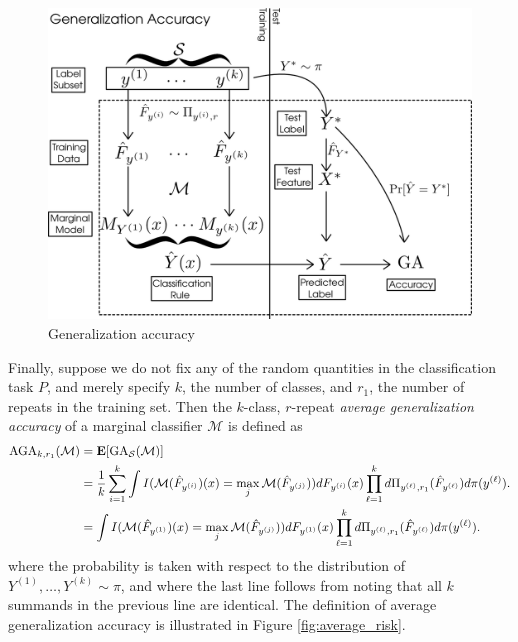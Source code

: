\begin{figure}[h]
\centering
\includegraphics[scale = 0.3]{../extrapolation_simple/risk.png}
\caption{Generalization accuracy}\label{fig:risk}
\end{figure}

Finally, suppose we do not fix any of the random quantities in the
classification task $P$, and merely specify $k$, the number of
classes, and $r_1$, the number of repeats in the training set.  
Then the $k$-class, $r$-repeat \emph{average generalization accuracy} of
a marginal classifier $\mathcal{M}$ is defined as
\begin{align*}
\text{AGA}_{k,r_1}(\mathcal{M}) &= \textbf{E}[\text{GA}_{\mathcal{S}}(\mathcal{M})]
\\&= \frac{1}{k} \sum_{i=1}^k \int
I(\mathcal{M}(\hat{F}_{y^{(i)}})(x) = \max_j
\mathcal{M}(\hat{F}_{y^{(j)}})) dF_{y^{(i)}}(x) \prod_{\ell=1}^k
d\Pi_{y^{(\ell)}, r_1}(\hat{F}_{y^{(\ell)}}) d\pi(y^{(\ell)}).
\\&= \int
I(\mathcal{M}(\hat{F}_{y^{(1)}})(x) = \max_j
\mathcal{M}(\hat{F}_{y^{(j)}})) dF_{y^{(1)}}(x) \prod_{\ell=1}^k
d\Pi_{y^{(\ell)}, r_1}(\hat{F}_{y^{(\ell)}}) d\pi(y^{(\ell)}).
\end{align*}
where the probability is taken with respect to the distribution of $Y^{(1)}, \hdots, Y^{(k)} \sim \pi$, and
where the last line follows from noting that all $k$ summands in the previous line are identical.
The definition of average generalization accuracy is illustrated in Figure \ref{fig:average_risk}.


